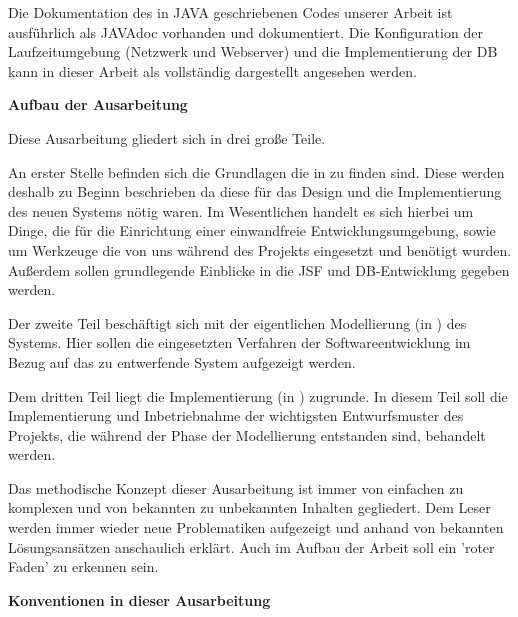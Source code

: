 Die Dokumentation des in \gls{JAVA} geschriebenen Codes unserer Arbeit ist ausführlich als \gls{JAVAdoc} vorhanden und dokumentiert. Die Konfiguration der Laufzeitumgebung (Netzwerk und Webserver) und die Implementierung der \ac{DB} kann in dieser Arbeit als vollständig dargestellt angesehen werden.

\textbf{Aufbau der Ausarbeitung}

Diese Ausarbeitung gliedert sich in drei große Teile. 

An erster Stelle befinden sich die Grundlagen die in  zu finden sind. Diese werden deshalb zu Beginn beschrieben da diese für das Design und die Implementierung des neuen Systems nötig waren.
Im Wesentlichen handelt es sich hierbei um Dinge, die für die Einrichtung einer einwandfreie Entwicklungsumgebung, sowie um Werkzeuge die von uns während des Projekts eingesetzt und benötigt wurden. Außerdem sollen grundlegende Einblicke in die \ac{JSF} und \ac{DB}-Entwicklung gegeben werden.

Der zweite Teil beschäftigt sich mit der eigentlichen Modellierung (in ) des Systems. Hier sollen die eingesetzten Verfahren der Softwareentwicklung im Bezug auf das zu entwerfende System aufgezeigt werden.

Dem dritten Teil liegt die Implementierung (in ) zugrunde. 
In diesem Teil soll die Implementierung und Inbetriebnahme der wichtigsten Entwurfsmuster des Projekts, die während der Phase der Modellierung entstanden sind, behandelt werden. 

Das methodische Konzept dieser Ausarbeitung ist immer von einfachen zu komplexen und von bekannten zu unbekannten Inhalten gegliedert. Dem Leser werden immer wieder neue Problematiken aufgezeigt und anhand von bekannten Lösungsansätzen anschaulich erklärt. Auch im Aufbau der Arbeit soll ein 'roter Faden' zu erkennen sein. 

\textbf{Konventionen in dieser Ausarbeitung}

